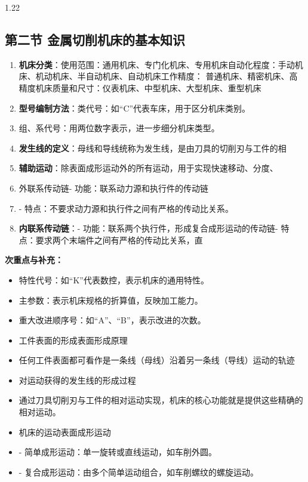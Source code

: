 \documentclass[12pt,a4paper]{article}
\begin{document}
\begin{spacing}{1.22}
\subsection{第二节 金属切削机床的基本知识}
\begin{tcolorbox}[colback=yellow!6,colframe=red!55!black,title=重点,left=1mm,right=1mm]
\begin{enumerate}[leftmargin=2.2em,label=\arabic*.]
  \item \textbf{机床分类}：使用范围：通用机床、专门化机床、专用机床自动化程度：手动机床、机动机床、半自动机床、自动机床工作精度： 普通机床、精密机床、高精度机床质量和尺寸：仪表机床、中型机床、大型机床、重型机床
  \item \textbf{型号编制方法}：类代号：如“C”代表车床，用于区分机床类别。
  \item 组、系代号：用两位数字表示，进一步细分机床类型。
  \item \textbf{发生线的定义}：母线和导线统称为发生线，是由刀具的切削刃与工件的相
  \item \textbf{辅助运动}：除表面成形运动外的所有运动，用于实现快速移动、分度、
  \item 外联系传动链- 功能：联系动力源和执行件的传动链
  \item - 特点：不要求动力源和执行件之间有严格的传动比关系。
  \item \textbf{内联系传动链}：- 功能：联系两个执行件，形成复合成形运动的传动链- 特点：要求两个末端件之间有严格的传动比关系，直
\end{enumerate}
\end{tcolorbox}
\noindent\textbf{次重点与补充：}
\begin{itemize}[leftmargin=2.2em,label=--]
  \item 特性代号：如“K”代表数控，表示机床的通用特性。
  \item 主参数：表示机床规格的折算值，反映加工能力。
  \item 重大改进顺序号：如“A”、“B”，表示改进的次数。
  \item 工件表面的形成表面形成原理
  \item 任何工件表面都可看作是一条线（母线）沿着另一条线（导线）运动的轨迹
  \item 对运动获得的发生线的形成过程
  \item 通过刀具切削刃与工件的相对运动实现，机床的核心功能就是提供这些精确的相对运动。
  \item 机床的运动表面成形运动
  \item - 简单成形运动：单一旋转或直线运动，如车削外圆。
  \item - 复合成形运动：由多个简单运动组合，如车削螺纹的螺旋运动。

\end{itemize}
\end{spacing}
\end{document}
